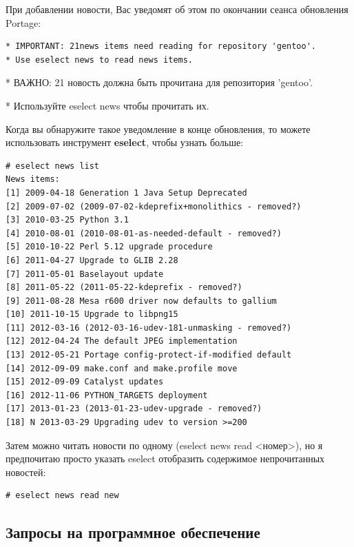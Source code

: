 \documentclass[10pt]{book}
\begin{document}
При добавлении новости, Вас уведомят об этом по окончании сеанса обновления Portage:
\begin{tcolorbox}
\begin{lstlisting}
* IMPORTANT: 21news items need reading for repository 'gentoo'.
* Use eselect news to read news items.
\end{lstlisting}
* ВАЖНО: 21 новость должна быть прочитана для репозитория 'gentoo'. 

* Используйте eselect news чтобы прочитать их.
\end{tcolorbox}

Когда вы обнаружите такое уведомление в конце обновления, то можете использовать инструмент \textbf{eselect}, чтобы узнать больше:

\begin{tcolorbox}
\begin{lstlisting}
# eselect news list
News items:
[1] 2009-04-18 Generation 1 Java Setup Deprecated
[2] 2009-07-02 (2009-07-02-kdeprefix+monolithics - removed?)
[3] 2010-03-25 Python 3.1
[4] 2010-08-01 (2010-08-01-as-needed-default - removed?)
[5] 2010-10-22 Perl 5.12 upgrade procedure
[6] 2011-04-27 Upgrade to GLIB 2.28
[7] 2011-05-01 Baselayout update
[8] 2011-05-22 (2011-05-22-kdeprefix - removed?)
[9] 2011-08-28 Mesa r600 driver now defaults to gallium
[10] 2011-10-15 Upgrade to libpng15
[11] 2012-03-16 (2012-03-16-udev-181-unmasking - removed?)
[12] 2012-04-24 The default JPEG implementation
[13] 2012-05-21 Portage config-protect-if-modified default
[14] 2012-09-09 make.conf and make.profile move
[15] 2012-09-09 Catalyst updates
[16] 2012-11-06 PYTHON_TARGETS deployment
[17] 2013-01-23 (2013-01-23-udev-upgrade - removed?)
[18] N 2013-03-29 Upgrading udev to version >=200
\end{lstlisting}
\end{tcolorbox}

Затем можно читать новости по одному (eselect news read <номер>), но я предпочитаю просто указать
eselect отобразить содержимое непрочитанных новостей:

\begin{tcolorbox}
\begin{lstlisting}
# eselect news read new
\end{lstlisting}
\end{tcolorbox}

\subsection{Запросы на программное обеспечение}
\end{document}
